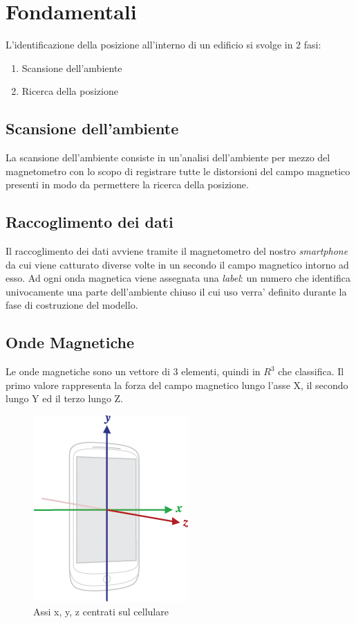 \chapter{Fondamentali}
L'identificazione della posizione all'interno di un edificio si svolge in 2 fasi:
\begin{enumerate}
	\item Scansione dell'ambiente
	\item Ricerca della posizione
\end{enumerate}

\section{Scansione dell'ambiente}
La scansione dell'ambiente consiste in un'analisi dell'ambiente per mezzo del magnetometro con lo scopo di registrare tutte le distorsioni del campo magnetico presenti in modo da permettere la ricerca della posizione.

\newpage
\section{Raccoglimento dei dati}
Il raccoglimento dei dati avviene tramite il magnetometro del nostro \textit{smartphone} da cui viene catturato diverse volte in un secondo il campo magnetico intorno ad esso.
Ad ogni onda magnetica viene assegnata una \textit{label}: un numero che identifica univocamente una parte dell'ambiente chiuso il cui uso verra' definito durante la fase di costruzione del modello.

\section{Onde Magnetiche}
Le onde magnetiche sono un vettore di 3 elementi, quindi in $R^3$ che classifica. Il primo valore rappresenta la forza del campo magnetico lungo l'asse X, il secondo lungo Y ed il terzo lungo Z.


\begin{figure}[H]
	\centering
	\includegraphics[width=0.20\linewidth]{./img/axis_magnetic_field.png}
	\caption{Assi x, y, z centrati sul cellulare}
	\label{fig:axis_magnetic_field}
\end{figure}


